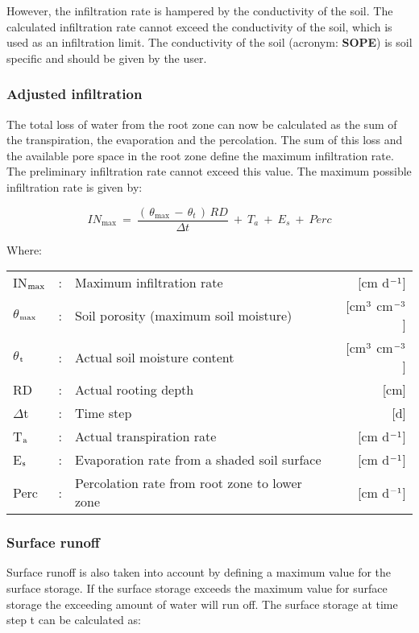 However, the infiltration rate is hampered by the conductivity of the soil. The calculated
infiltration rate cannot exceed the conductivity of the soil, which is used as an infiltration
limit. The conductivity of the soil (acronym: {\bf SOPE}) is soil specific and should be given
by the user.

\subsubsection{Adjusted infiltration}
The total loss of water from the root zone can now be calculated as the sum of the
transpiration, the evaporation and the percolation. The sum of this loss and the available
pore space in the root zone define the maximum infiltration rate. The preliminary
infiltration rate cannot exceed this value. The maximum possible infiltration rate is given
by:

\begin{equation}
\label{eq:6.28}
IN_{\max } ~=~{\frac{(\, \theta  _{\max } \, -\, \theta  _{t} \, )\, RD}{\Delta t}} ~+~ T _{a} ~+~ E _{s} ~+~ Perc
\end{equation}

Where:\\[5pt]
\begin{tabularx}{\textwidth}{llXr}
	IN$_{{\rm max}}$ &:& Maximum infiltration rate  & [cm d$^{{\rm -1}}$]\\
	$\theta$$_{{\rm max}}$ &:& Soil porosity (maximum soil moisture)  
	& [cm$^{{\rm 3}}$ cm$^{{\rm -3}}$]\\
	$\theta$$_{{\rm t}}$ &:& Actual soil moisture content  
	& [cm$^{{\rm 3}}$ cm$^{{\rm -3}}$]\\
	RD &:& Actual rooting depth  & [cm]\\
	$\Delta$t &:& Time step  & [d]\\
	T$_{{\rm a}}$ &:& Actual transpiration rate   & [cm d$^{{\rm -1}}$]\\
	E$_{{\rm s}}$ &:& Evaporation rate from a shaded soil surface  & [cm d$^{{\rm -1}}$]\\
	Perc &:& Percolation rate from root zone to lower zone  & [cm d$^{{\rm -1}}$]\\
\end{tabularx}

\subsubsection{Surface runoff}

Surface runoff is also taken into account by defining a maximum value for the surface
storage. If the surface storage exceeds the maximum value for surface storage the
exceeding amount of water will run off. The surface storage at time step t can be
calculated as:

